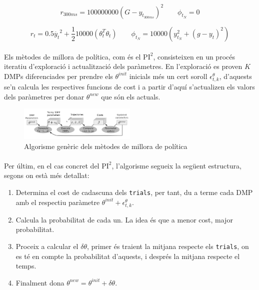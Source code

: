 \documentclass[12pt,a4paper,final,twoside]{article}
\begin{document}
\begin{equation}
r_{300ms} = 100000000(G-y_{t_{300ms}})^2    \qquad {}  \phi_{t_N} = 0\label{eq:funcio-costos-waypoint}
\end{equation}

\begin{equation}
r_t = 0.5\ddot{y_t}^2 + \frac{1}{2}10000( \theta_t^T \theta_t)    \qquad {}  \phi_{t_N} = 10000(y_{t_N}^2 + (g-y_t)^2)\label{eq:funcio-costos-general}
\end{equation}

\paragraph{}Els mètodes de millora de política, com és el $\mathrm{PI^2}$, consisteixen en un procés iteratiu d'exploració i actualització dels paràmetres. En l'exploració es proven $K$ DMPs diferenciades per prendre els $\theta^{init}$ inicials més un cert soroll $\epsilon_{t,k}^{\theta}$, d'aquests se'n calcula les respectives funcions de cost i a partir d'aquí s'actualizen els valors dels paràmetres per donar $\theta^{new}$ que són els actuals.

\begin{figure}[h]
\centering
\includegraphics[width=0.5\textwidth]{Imatges/policy-improvement-loop}
\caption{Algorisme genèric dels mètodes de millora de política \cite{Stulp2011}}
\label{fig:policy-improvement-loop}
\end{figure}

\paragraph{}Per últim, en el cas concret del $\mathrm{PI^2}$, l'algorisme segueix la següent estructura, segons \cite{Stulp2011} on està més detallat:

\begin{enumerate}
\item Determina el cost de cadascuna dels \texttt{trials}, per tant, du a terme cada DMP amb el respectiu paràmetre $\theta^{init} + \epsilon_{t,k}^{\theta}$.

\item Calcula la probabilitat de cada un. La idea és que a menor cost, major probabilitat.

\item Proceix a calcular el $\delta\theta$, primer és traient la mitjana respecte els \texttt{trials}, on es té en compte la probabilitat d'aquests, i després la mitjana respecte el temps.

\item Finalment dona $\theta^{new} = \theta^{init} + \delta\theta$.
\end{enumerate}
\end{document}
